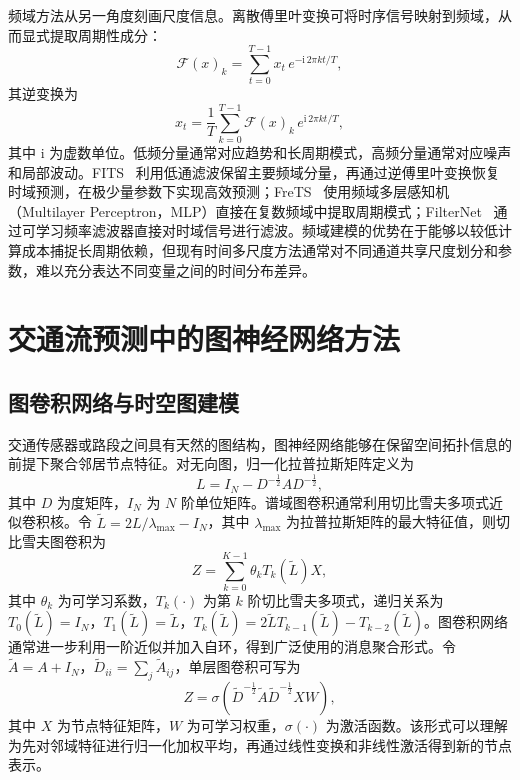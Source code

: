 频域方法从另一角度刻画尺度信息。离散傅里叶变换可将时序信号映射到频域，从而显式提取周期性成分：
\begin{equation}
\mathcal{F}(x)_k = \sum_{t=0}^{T-1} x_t \, e^{-\mathrm{i}\, 2\pi k t / T},
\end{equation}
其逆变换为
\begin{equation}
x_t = \frac{1}{T} \sum_{k=0}^{T-1} \mathcal{F}(x)_k \, e^{\mathrm{i}\, 2\pi k t / T},
\end{equation}
其中 $\mathrm{i}$ 为虚数单位。低频分量通常对应趋势和长周期模式，高频分量通常对应噪声和局部波动。FITS~\cite{fits} 利用低通滤波保留主要频域分量，再通过逆傅里叶变换恢复时域预测，在极少量参数下实现高效预测；FreTS~\cite{frets} 使用频域多层感知机（Multilayer Perceptron，MLP）直接在复数频域中提取周期模式；FilterNet~\cite{filternet} 通过可学习频率滤波器直接对时域信号进行滤波。频域建模的优势在于能够以较低计算成本捕捉长周期依赖，但现有时间多尺度方法通常对不同通道共享尺度划分和参数，难以充分表达不同变量之间的时间分布差异。

\section{交通流预测中的图神经网络方法}

\subsection{图卷积网络与时空图建模}

交通传感器或路段之间具有天然的图结构，图神经网络能够在保留空间拓扑信息的前提下聚合邻居节点特征。对无向图，归一化拉普拉斯矩阵定义为
\begin{equation}
L = I_N - D^{-\frac{1}{2}} A D^{-\frac{1}{2}},
\end{equation}
其中 $D$ 为度矩阵，$I_N$ 为 $N$ 阶单位矩阵。谱域图卷积通常利用切比雪夫多项式近似卷积核。令 $\tilde{L} = 2L/\lambda_{\max} - I_N$，其中 $\lambda_{\max}$ 为拉普拉斯矩阵的最大特征值，则切比雪夫图卷积为
\begin{equation}
Z = \sum_{k=0}^{K-1} \theta_k T_k\!\left(\tilde{L}\right) X,
\end{equation}
其中 $\theta_k$ 为可学习系数，$T_k(\cdot)$ 为第 $k$ 阶切比雪夫多项式，递归关系为 $T_0(\tilde{L})=I_N$，$T_1(\tilde{L})=\tilde{L}$，$T_k(\tilde{L})=2\tilde{L}T_{k-1}(\tilde{L})-T_{k-2}(\tilde{L})$。图卷积网络通常进一步利用一阶近似并加入自环，得到广泛使用的消息聚合形式。令 $\tilde{A} = A + I_N$，$\tilde{D}_{ii} = \sum_{j} \tilde{A}_{ij}$，单层图卷积可写为
\begin{equation}
Z = \sigma\!\left(\tilde{D}^{-\frac{1}{2}} \tilde{A} \tilde{D}^{-\frac{1}{2}} X W\right),
\end{equation}
其中 $X$ 为节点特征矩阵，$W$ 为可学习权重，$\sigma(\cdot)$ 为激活函数。该形式可以理解为先对邻域特征进行归一化加权平均，再通过线性变换和非线性激活得到新的节点表示。


